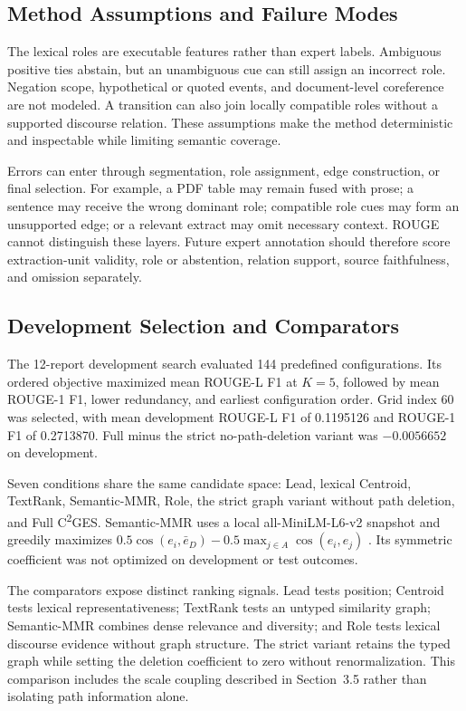 \documentclass[applsci,article,submit,moreauthors]{Definitions/mdpi}
\newcommand{\cges}{C\textsuperscript{2}GES}
\begin{document}
\subsection{Method Assumptions and Failure Modes}

The lexical roles are executable features rather than expert labels. Ambiguous positive ties abstain, but an unambiguous cue can still assign an incorrect role. Negation scope, hypothetical or quoted events, and document-level coreference are not modeled. A transition can also join locally compatible roles without a supported discourse relation. These assumptions make the method deterministic and inspectable while limiting semantic coverage.

Errors can enter through segmentation, role assignment, edge construction, or final selection. For example, a PDF table may remain fused with prose; a sentence may receive the wrong dominant role; compatible role cues may form an unsupported edge; or a relevant extract may omit necessary context. ROUGE cannot distinguish these layers. Future expert annotation should therefore score extraction-unit validity, role or abstention, relation support, source faithfulness, and omission separately.

\subsection{Development Selection and Comparators}

The 12-report development search evaluated 144 predefined configurations. Its ordered objective maximized mean ROUGE-L F1 at $K=5$, followed by mean ROUGE-1 F1, lower redundancy, and earliest configuration order. Grid index 60 was selected, with mean development ROUGE-L F1 of 0.1195126 and ROUGE-1 F1 of 0.2713870. Full minus the strict no-path-deletion variant was $-0.0056652$ on development.

Seven conditions share the same candidate space: Lead, lexical Centroid, TextRank, Semantic-MMR, Role, the strict graph variant without path deletion, and Full \cges{}. Semantic-MMR uses a local all-MiniLM-L6-v2 snapshot and greedily maximizes $0.5\cos(e_i,\bar e_D)-0.5\max_{j\in A}\cos(e_i,e_j)$ \cite{reimers2019sentencebert}. Its symmetric coefficient was not optimized on development or test outcomes.

The comparators expose distinct ranking signals. Lead tests position; Centroid tests lexical representativeness; TextRank tests an untyped similarity graph; Semantic-MMR combines dense relevance and diversity; and Role tests lexical discourse evidence without graph structure. The strict variant retains the typed graph while setting the deletion coefficient to zero without renormalization. This comparison includes the scale coupling described in Section~3.5 rather than isolating path information alone.
\end{document}
